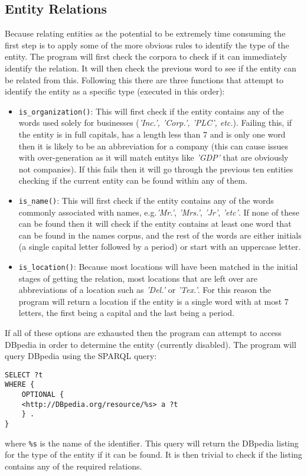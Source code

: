 \documentclass[draft]{article}
\begin{document}
\begin{multicols*}{2}
\section*{Entity Relations}
Because relating entities as the potential to be extremely time consuming the first step is to apply some of the more obvious rules to identify the type of the entity. The program will first check the corpora to check if it can immediately identify the relation. It will then check the previous word to see if the entity can be related from this. Following this there are three functions that attempt to identify the entity as a specific type (executed in this order):
\begin{itemize}
\item \texttt{is\_organization()}: This will first check if the entity contains any of the words used solely for businesses (\textit{'Inc.', 'Corp.', 'PLC', etc.}). Failing this, if the entity is in full capitals, has a length less than 7 and is only one word then it is likely to be an abbreviation for a company (this can cause issues with over-generation as it will match entitys like \textit{'GDP'} that are obviously not companies). If this fails then it will go through the previous ten entities checking if the current entity can be found within any of them.
\item \texttt{is\_name()}: This will first check if the entity contains any of the words commonly associated with names, e.g.\textit{'Mr.'}, \textit{'Mrs.'}, \textit{'Jr'}, \textit{'etc'}. If none of these can be found then it will check if the entity contains at least one word that can be found in the names corpus, and the rest of the words are either initials (a single capital letter followed by a period) or start with an uppercase letter.
\item \texttt{is\_location()}: Because most locations will have been matched in the initial stages of getting the relation, most locations that are left over are abbreviations of a location such as \textit{'Del.'} or \textit{'Tex.'}. For this reason the program will return a location if the entity is a single word with at most 7 letters, the first being a capital and the last being a period. 
\end{itemize}

If all of these options are exhausted then the program can attempt to access DBpedia in order to determine the entity (currently disabled). The program will query DBpedia using the SPARQL \citep{SPARQL} query:
\begin{verbatim}
SELECT ?t
WHERE {
	OPTIONAL { 
	<http://DBpedia.org/resource/%s> a ?t 
	} .
}
\end{verbatim}
where \texttt{\%s} is the name of the identifier. This query will return the DBpedia listing for the type of the entity if it can be found. It is then trivial to check if the listing contains any of the required relations. 


\end{multicols*}
\end{document}
